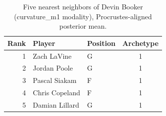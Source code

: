 \begin{table}[htbp]
  \centering\small
  \begin{tabular}{rllc}
    \toprule
    Rank & Player & Position & Archetype \\
    \midrule
    1 & Zach LaVine & G & 1 \\
    2 & Jordan Poole & G & 1 \\
    3 & Pascal Siakam & F & 1 \\
    4 & Chris Copeland & F & 1 \\
    5 & Damian Lillard & G & 1 \\
    \bottomrule
  \end{tabular}
  \caption{Five nearest neighbors of Devin Booker (curvature_m1 modality), Procrustes-aligned posterior mean.}
  \label{tab:Devin_Booker_neighbors_curvature_m1}
\end{table}

